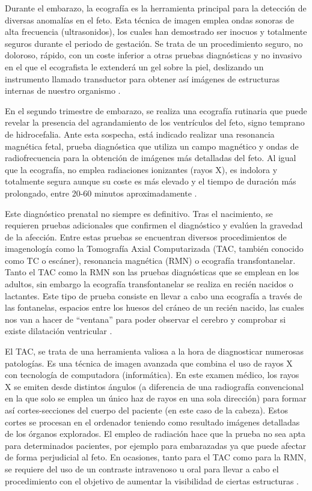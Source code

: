 Durante el embarazo, la ecografía es la herramienta principal para la detección de diversas anomalías en el feto. Esta técnica de imagen emplea ondas sonoras de alta frecuencia (ultrasonidos), los cuales han demostrado ser inocuos y totalmente seguros durante el periodo de gestación. Se trata de un procedimiento seguro, no doloroso, rápido, con un coste inferior a otras pruebas diagnósticas y no invasivo en el que el ecografista le extenderá un gel sobre la piel, deslizando un instrumento llamado transductor para obtener así imágenes de estructuras internas de nuestro organismo \cite{eco}.

En el segundo trimestre de embarazo, se realiza una ecografía rutinaria que puede revelar la presencia del agrandamiento de los ventrículos del feto, signo temprano de hidrocefalia. Ante esta sospecha, está indicado realizar una resonancia magnética fetal, prueba diagnóstica que utiliza un campo magnético y ondas de radiofrecuencia para la obtención de imágenes más detalladas del feto. Al igual que la ecografía, no emplea radiaciones ionizantes (rayos X), es indolora y totalmente segura aunque su coste es más elevado y el tiempo de duración más prolongado, entre 20-60 minutos aproximadamente \cite{rmn_fetal}.

Este diagnóstico prenatal no siempre es definitivo. Tras el nacimiento, se requieren pruebas adicionales que confirmen el diagnóstico y evalúen la gravedad de la afección. Entre estas pruebas se encuentran diversos procedimientos de imagenología como la Tomografía Axial Computarizada (TAC, también conocido como TC o escáner), resonancia magnética (RMN) o ecografía transfontanelar. Tanto el TAC como la RMN son las pruebas diagnósticas que se emplean en los adultos, sin embargo la ecografía transfontanelar se realiza en recién nacidos o lactantes. Este tipo de prueba consiste en llevar a cabo una ecografía a través de las fontanelas, espacios entre los huesos del cráneo de un recién nacido, las cuales nos van a hacer de “ventana” para poder observar el cerebro y comprobar si existe dilatación ventricular \cite{eco_trans}. 

El TAC, se trata de una herramienta valiosa a la hora de diagnosticar numerosas patologías. Es una técnica de imagen avanzada que combina el uso de rayos X con tecnología de computadora (informática). En este examen médico, los rayos X se emiten desde distintos ángulos (a diferencia de una radiografía convencional en la que solo se emplea un único haz de rayos en una sola dirección) para formar así cortes-secciones del cuerpo del paciente (en este caso de la cabeza). Estos cortes se procesan en el ordenador teniendo como resultado imágenes detalladas de los órganos explorados. El empleo de radiación hace que la prueba no sea apta para determinados pacientes, por ejemplo para embarazadas ya que puede afectar de forma perjudicial al feto. En ocasiones, tanto para el TAC como para la RMN, se requiere del uso de un contraste intravenoso u oral para llevar a cabo el procedimiento con el objetivo de aumentar la visibilidad de ciertas estructuras \cite{tac}. 


